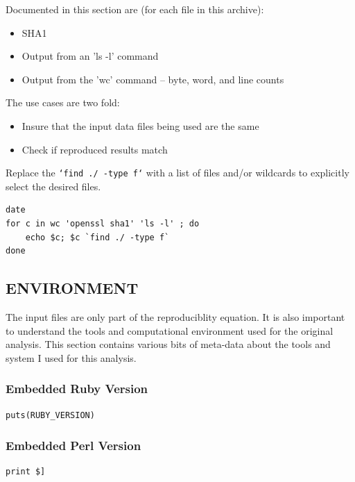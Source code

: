 \documentclass[11pt]{article}
\begin{document}
Documented in this section are (for each file in this archive):

\begin{itemize}
\item SHA1
\item Output from an 'ls -l' command
\item Output from the 'wc' command -- byte, word, and line counts
\end{itemize}

The use cases are two fold:

\begin{itemize}
\item Insure that the input data files being used are the same
\item Check if reproduced results match
\end{itemize}

Replace the \texttt{`find ./ -type f`} with a list of files and/or wildcards to explicitly select the desired files.

\begin{verbatim}
date
for c in wc 'openssl sha1' 'ls -l' ; do
    echo $c; $c `find ./ -type f`
done
\end{verbatim}

\subsection{ENVIRONMENT}
\label{sec:org0e2ba9d}

The input files are only part of the reproduciblity equation.  It is also important to understand the tools and computational environment used for the
original analysis.  This section contains various bits of meta-data about the tools and system I used for this analysis.

\subsubsection{Embedded Ruby Version}
\label{sec:org2c45e38}

\begin{verbatim}
puts(RUBY_VERSION)
\end{verbatim}

\subsubsection{Embedded Perl Version}
\label{sec:orga805d34}

\begin{verbatim}
print $]
\end{verbatim}
\end{document}
